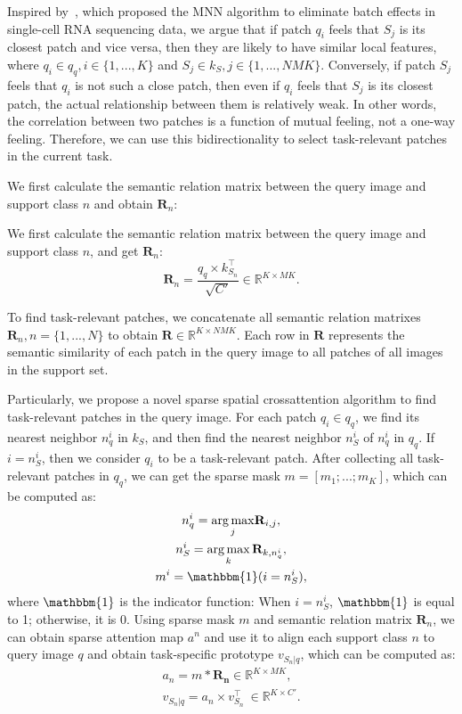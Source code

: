 \documentclass{SCIS2019}
\DeclareMathOperator*{\argmax}{arg\,max}
\begin{document}
Inspired by~\cite{17}, which proposed the MNN algorithm to eliminate batch effects in single-cell RNA sequencing data, we argue that if patch $q_i$ feels that $S_j$ is its closest patch and vice versa, then they are likely to have similar local features, where $q_i\in q_q, i\in\{1, ..., K\}$ and $S_j\in k_S, j\in\{1, ..., NMK\}$. Conversely, if patch $S_j$ feels that $q_i$ is not such a close patch, then even if $q_i$ feels that $S_j$ is its closest patch, the actual relationship between them is relatively weak. In other words, the correlation between two patches is a function of mutual feeling, not a one-way feeling. Therefore, we can use this bidirectionality to select task-relevant patches in the current task.

We first calculate the semantic relation matrix between the query image and support class $n$ and obtain $\mathbf{R}_n$:

We first calculate the semantic relation matrix between the query image and support class $n$, and get $\mathbf{R}_n$:
\begin{equation}
	\mathbf{R}_n = \frac{q_q\times k_{S_n}^\top}{\sqrt{C'}}\in \mathbb{R}^{K \times MK}.
\end{equation}

To find task-relevant patches, we concatenate all semantic relation matrixes $\mathbf{R}_n, n=\{1, ..., N\}$ to obtain $\mathbf{R}\in \mathbb{R}^{K \times NMK}$. Each row in $\mathbf{R}$ represents the semantic similarity of each patch in the query image to all patches of all images in the support set.

Particularly, we propose a novel sparse spatial crossattention algorithm to find task-relevant patches in the query image.
For each patch $q_i\in q_q$, we find its nearest neighbor $n_q^i$ in $k_S$, and then find the nearest neighbor $n_S^i$ of $n_q^i$ in $q_q$. If $i=n_S^i$, then we consider $q_i$ to be a task-relevant patch. After collecting all task-relevant patches in $q_q$, we can get the sparse mask $m=[m_1;...;m_K]$, which can be computed as:
\begin{gather}
	n_q^i = {\argmax_{j} }\mathbf{R}_{i,j},\\
	n_S^i = \argmax_{k} \mathbf{R}_{k,n_q^i},\\	
	m^i = \mathbbm{1}(i = n_S^i),
\end{gather}
where $\mathbbm{1}$ is the indicator function: When $i = n_S^i$, $\mathbbm{1}$ is equal to 1; otherwise, it is 0. Using sparse mask $m$ and semantic relation matrix $\mathbf{R}_n$, we can obtain sparse attention map $a^n$ and use it to align each support class $n$ to query image $q$ and obtain task-specific prototype $v_{S_n|q}$, which can be computed as:
\begin{gather}
	a_n = m * \mathbf{R_n} \in \mathbb{R}^{K\times MK}, \\
	v_{S_n|q} = a_n\times v_{S_n}^\top\ \in \mathbb{R}^{K\times C'}.
\end{gather}
\end{document}
